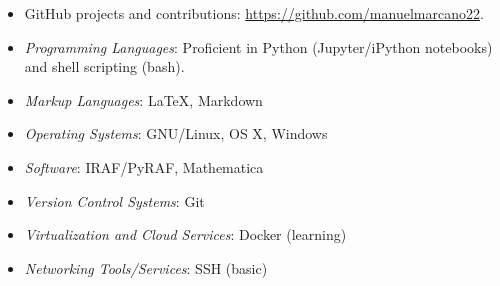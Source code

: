 \documentclass[letterpaper,10pt]{article}
\begin{document}
\begin{itemize}[label=$\blacktriangleright$]
	\item GitHub projects and contributions: \href{https://github.com/manuelmarcano22}{https://github.com/manuelmarcano22}.
  \end{itemize}


\begin{itemize}[label=$\blacktriangleright$]
	\item \emph{Programming Languages}: Proficient in Python (Jupyter/iPython notebooks) and shell scripting (bash). 
\end{itemize}

  \begin{itemize}[label=$\blacktriangleright$]
        \item \emph{Markup Languages}: \LaTeX, Markdown
  \end{itemize}

  \begin{itemize}[label=$\blacktriangleright$]
  \item \emph{Operating Systems}: GNU/Linux, OS X, Windows
    \end{itemize}

  \begin{itemize}[label=$\blacktriangleright$]
          \item \emph{Software}: IRAF/PyRAF, Mathematica
    \end{itemize}

  \begin{itemize}[label=$\blacktriangleright$]
          \item \emph{Version Control Systems}: Git
    \end{itemize}
  
    \begin{itemize}[label=$\blacktriangleright$]
            \item \emph{Virtualization and Cloud Services}: Docker (learning)
    \end{itemize}
    
    \begin{itemize}[label=$\blacktriangleright$]
            \item \emph{Networking Tools/Services}: SSH (basic)
    \end{itemize}


\end{document}

